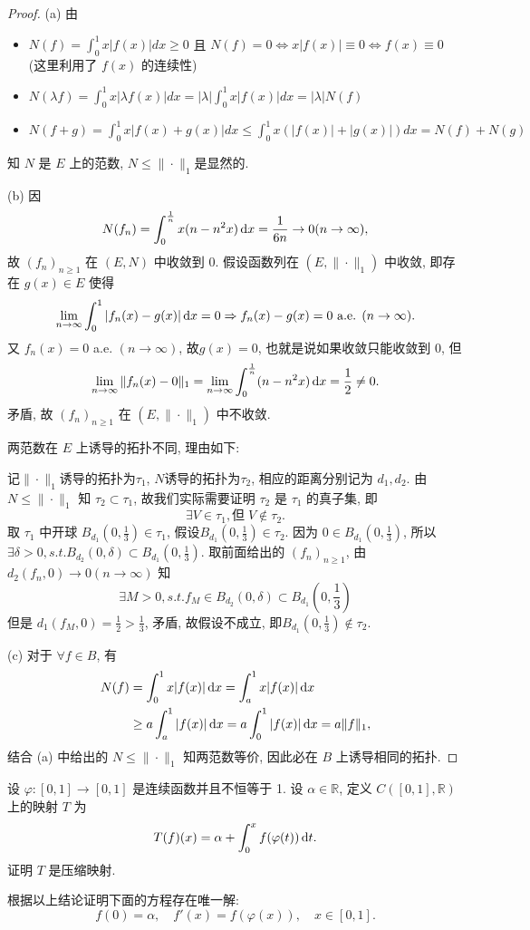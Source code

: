 \begin{proof}
(a) 由
\begin{itemize}
\item $N(f)=\int_0^1x|f(x)|dx\geq 0$ 且 $N(f)=0\Leftrightarrow x|f(x)|\equiv 0\Leftrightarrow f(x)\equiv 0$ (这里利用了 $f(x)$ 的连续性)
\item $N(\lambda f)=\int_0^1x|\lambda f(x)|dx=|\lambda|\int_0^1x|f(x)|dx=|\lambda|N(f)$
\item $N(f+g)=\int_0^1x|f(x)+g(x)|dx\leq \int_0^1x(|f(x)|+|g(x)|)dx=N(f)+N(g)$
\end{itemize}
知 $N$ 是 $E$ 上的范数, $N\leq\|\cdot\|_1$是显然的.

(b) 因
\[N(f_n)=\int_0^{\frac{1}{n}}x(n-n^2x)\mathop{}\!\mathrm{d} x=\frac{1}{6n}\rightarrow 0(n\to\infty),\]
故 $(f_n)_{n\geq 1}$ 在 $(E,N)$ 中收敛到 $0$. 
假设函数列在 $(E,\|\cdot\|_1)$ 中收敛, 即存在 $g(x)\in E$ 使得
\[\lim_{n\to\infty}\int_0^1|f_n(x)-g(x)|\mathop{}\!\mathrm{d} x=0\Rightarrow f_n(x)-g(x)=0\text{ a.e. }(n\to\infty).\]
又 $f_n(x)=0$ a.e. $(n\to\infty)$, 故$g(x)=0$, 也就是说如果收敛只能收敛到 0, 但
\[\lim_{n\to\infty}\|f_n(x)-0\|_1=\lim_{n\to\infty}\int_0^{\frac{1}{n}}(n-n^2x)\mathop{}\!\mathrm{d} x=\frac{1}{2}\neq 0.\]
矛盾, 故 $(f_n)_{n\geq 1}$ 在 $(E,\|\cdot\|_1)$ 中不收敛.

两范数在 $E$ 上诱导的拓扑不同, 理由如下:

记$\|\cdot\|_1$诱导的拓扑为$\tau_1$, $N$诱导的拓扑为$\tau_2$, 
相应的距离分别记为 $d_1,d_2$. 
由 $N\leq \|\cdot\|_1$ 知 $\tau_2\subset\tau_1$, 
故我们实际需要证明 $\tau_2$ 是 $\tau_1$ 的真子集, 即
\[\exists V\in\tau_1,\text{但}\;V\notin\tau_2.\]
取 $\tau_1$ 中开球 $B_{d_1}(0,\frac{1}{3})\in\tau_1$,
假设$B_{d_1}(0,\frac{1}{3})\in\tau_2$. 因为 $0\in B_{d_1}(0,\frac{1}{3})$, 
所以 $\exists\delta>0,s.t.B_{d_2}(0,\delta)\subset B_{d_1}(0,\frac{1}{3})$.
取前面给出的 $(f_n)_{n\geq 1}$, 由$d_2(f_n,0)\to 0(n\to\infty)$ 知
\[\exists M>0,s.t.f_M\in B_{d_2}(0,\delta)\subset B_{d_1}(0,\frac{1}{3})\]
但是 $d_1(f_M,0)=\frac{1}{2}>\frac{1}{3}$, 矛盾, 故假设不成立, 即$B_{d_1}(0,\frac{1}{3})\notin\tau_2$.

(c) 对于 $\forall f\in B$, 有 
\begin{align*}
    N(f) & =\int_0^1x|f(x)|\mathop{}\!\mathrm{d} x=\int_a^1 x|f(x)|\mathop{}\!\mathrm{d} x \\
         & \geq a\int_a^1|f(x)|\mathop{}\!\mathrm{d} x=a\int_0^1|f(x)|\mathop{}\!\mathrm{d} x=a\|f\|_1,
\end{align*} 
结合 (a) 中给出的 $N\leq\|\cdot\|_1$ 知两范数等价, 因此必在 $B$ 上诱导相同的拓扑.
\end{proof}


\begin{exercise}
     设 $\varphi:[0,1]\to[0,1]$ 是连续函数并且不恒等于 1. 设 $\alpha\in\mathbb{R}$, 定义 $C([0,1],\mathbb{R})$ 上的映射 $T$ 为
    \[T(f)(x)=\alpha+\int_0^xf(\varphi(t))\mathop{}\!\mathrm{d} t.\]
    证明 $T$ 是压缩映射.

    根据以上结论证明下面的方程存在唯一解:
    \[f(0)=\alpha,\quad f'(x)=f(\varphi(x)),\quad x\in[0,1].\]
\end{exercise}



